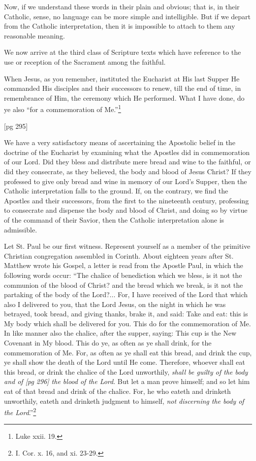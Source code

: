 Now, if we understand these words in their
plain and obvious; that is, in their Catholic, sense,
no language can be more simple and intelligible.
But if we depart from the Catholic interpretation,
then it is impossible to attach to them any reasonable
meaning.

We now arrive at the third class of Scripture
texts which have reference to the use or reception
of the Sacrament among the faithful.

When Jesus, as you remember, instituted the
Eucharist at His last Supper He commanded His
disciples and their successors to renew, till the
end of time, in remembrance of Him, the ceremony
which He performed. What I have done,
do ye also “for a commemoration of Me.”\footnote{Luke xxii. 19.}

[pg 295]

We have a very satisfactory means of ascertaining
the Apostolic belief in the doctrine of the
Eucharist by examining what the Apostles did in
commemoration of our Lord. Did they bless and
distribute mere bread and wine to the faithful, or
did they consecrate, as they believed, the body and
blood of Jesus Christ? If they professed to give
only bread and wine in memory of our Lord's
Supper, then the Catholic interpretation falls to
the ground. If, on the contrary, we find the
Apostles and their successors, from the first to the
nineteenth century, professing to consecrate and
dispense the body and blood of Christ, and doing
so by virtue of the command of their Savior, then
the Catholic interpretation alone is admissible.

Let St. Paul be our first witness. Represent yourself
as a member of the primitive Christian congregation
assembled in Corinth. About eighteen
years after St. Matthew wrote his Gospel, a letter
is read from the Apostle Paul, in which the following
words occur: “The chalice of benediction
which we bless, is it not the communion of the
blood of Christ? and the bread which we break,
is it not the partaking of the body of the Lord?...
For, I have received of the Lord that which
also I delivered to you, that the Lord Jesus, on the
night in which he was betrayed, took bread, and
giving thanks, brake it, and said: Take and eat:
this is My body which shall be delivered for you.
This do for the commemoration of Me. In like
manner also the chalice, after the supper, saying:
This cup is the New Covenant in My blood. This
do ye, as often as ye shall drink, for the commemoration
of Me. For, as often as ye shall eat this
bread, and drink the cup, ye shall show the death
of the Lord until He come. Therefore, whoever
shall eat this bread, or drink the chalice of the
Lord unworthily, \emph{shall be guilty of the body and of
[pg 296]
the blood of the Lord}. But let a man prove himself;
and so let him eat of that bread and drink of
the chalice. For, he who eateth and drinketh unworthily,
eateth and drinketh judgment to himself,
\emph{not discerning the body of the Lord}.”\footnote{I.
Cor. x. 16, and xi. 23-29.}

